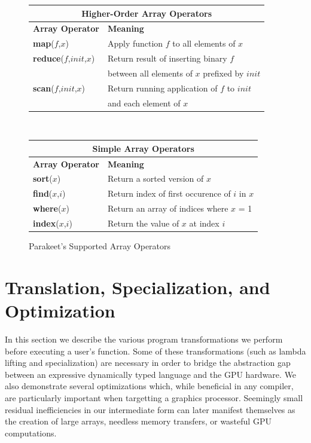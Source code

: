 \documentclass[preprint]{sigplanconf}
\begin{document}
\begin{figure}
\begin{center}
\begin{tabular}{|p{2.25cm}|p{5.5cm}|}
\hline
\multicolumn{2}{|c|}{\textbf{Higher-Order Array Operators}}\\[4pt] \hline
\textbf{Array Operator} & \textbf{Meaning}\\[4pt] \hline
\textbf{map}($f$,$x$) & Apply function $f$ to all elements of $x$\\[4pt] \hline
\textbf{reduce}($f$,$init$,$x$) & Return result of inserting binary $f$ \\
& between all elements of $x$ prefixed by $init$\\[4pt] \hline
\textbf{scan}($f$,$init$,$x$) & Return running application of $f$ to $init$ \\
& and each element of $x$\\[4pt] \hline
\end{tabular}
\\[12pt]
\begin{tabular}{|p{2.25cm}|p{5.5cm}|}
\hline
\multicolumn{2}{|c|}{\textbf{Simple Array Operators}}\\[4pt] \hline
\textbf{Array Operator} & \textbf{Meaning}\\[4pt] \hline
\textbf{sort}($x$) & Return a sorted version of $x$\\[4pt] \hline
\textbf{find}($x$,$i$) & Return index of first occurence of $i$ in
$x$\\[4pt] \hline
\textbf{where}($x$) & Return an array of indices where $x$ = 1\\[4pt] \hline
\textbf{index}($x$,$i$) & Return the value of $x$ at index $i$\\[4pt] \hline

\end{tabular}
\caption{Parakeet's Supported Array Operators}
\label{ArrayOps}
\end{center}
\end{figure}

\section{Translation, Specialization, and Optimization}
\label{Compilation}
In this section we describe the various program transformations we perform before executing a user's function. Some of these transformations (such as lambda lifting and specialization) are necessary in order to bridge the abstraction gap between an expressive dynamically typed language and the GPU hardware. We also demonstrate several optimizations which, while beneficial in any compiler, are particularly important when targetting a graphics processor. Seemingly small residual inefficiencies in our intermediate form can later manifest themselves as the creation of large arrays, needless memory transfers, or wasteful GPU computations.
\end{document}
